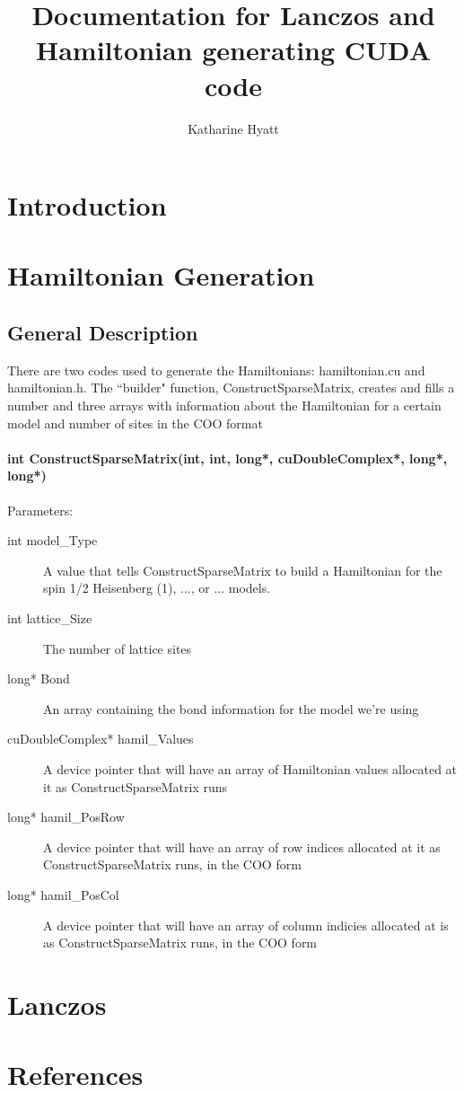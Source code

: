 \documentclass{article}
\author{Katharine Hyatt}
\title{Documentation for Lanczos and Hamiltonian generating CUDA code}
\begin{document}
\maketitle

\section{Introduction}

\section{Hamiltonian Generation}

\subsection{General Description}

There are two codes used to generate the Hamiltonians: hamiltonian.cu and hamiltonian.h. The ``builder" function, ConstructSparseMatrix, creates and fills a number and three arrays with information about the Hamiltonian for a certain model and number of sites in the COO format

\paragraph{int ConstructSparseMatrix(int, int, long*, cuDoubleComplex*, long*, long*)}

Parameters:
\begin{description}
\item[int model_Type] A value that tells ConstructSparseMatrix to build a Hamiltonian for the spin 1/2 Heisenberg (1), ..., or ... models.
\item[int lattice_Size] The number of lattice sites
\item[long* Bond] An array containing the bond information for the model we're using 
\item[cuDoubleComplex* hamil_Values] A device pointer that will have an array of Hamiltonian values allocated at it as ConstructSparseMatrix runs
\item[long* hamil_PosRow] A device pointer that will have an array of row indices allocated at it as ConstructSparseMatrix runs, in the COO form
\item[long* hamil_PosCol] A device pointer that will have an array of column indicies allocated at is as ConstructSparseMatrix runs, in the COO form
\end{description}

\section{Lanczos}

\section{References}
\end{document}

